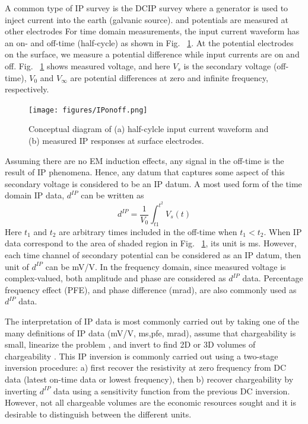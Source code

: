 \documentclass[letterpaper,11pt]{article}
\newcommand{\dip}{d^{IP}}
\begin{document}
A common type of IP survey is the  DCIP survey where a generator is used to  inject current into the earth (galvanic source). and potentials are measured at other electrodes For time domain measurements, the input current waveform has an  on- and off-time (half-cycle) as shown in Fig. ~\ref{Fig:IPonoff}. At the  potential electrodes on the surface, we measure a potential difference while input currents are on and off. Fig. ~\ref{Fig:IPonoff} shows measured voltage, and here $V_s$ is the secondary voltage (off-time), $V_0$ and $V_{\infty}$ are potential differences at zero and infinite frequency, respectively. 
\begin{figure}[htb]
  \centering
  \texttt{[image: figures/IPonoff.png]}
  \caption{Conceptual diagram of (a) half-cylcle input current waveform and (b) measured IP responses at surface electrodes.}
  \label{Fig:IPonoff}
\end{figure}
Assuming there are no EM induction effects, any signal in the off-time is the result of IP phenomena. Hence, any datum that captures some aspect of this secondary voltage is considered to be an IP datum. A most used form of the time domain IP data, $\dip$ can be written as  
\begin{equation}
  \dip = \frac{1}{V_0}\int_{t1}^{t^2} V_s(t)
\end{equation}
Here $t_1$ and $t_2$ are arbitrary times included in the off-time when $t_1 < t_2$. When IP data correspond to the area of shaded region in Fig. ~\ref{Fig:IPonoff},  its unit is ms. However, each time channel of secondary potential can be considered as an IP datum, then unit of $\dip$ can be mV/V. In the frequency domain, since measured voltage is complex-valued, both amplitude and phase are considered as $\dip$ data. Percentage frequency effect (PFE), and phase difference (mrad), are also commonly used as $\dip$ data.  

The interpretation of IP data is most commonly carried out by taking one of the many definitions of IP data (mV/V, ms,pfe, mrad), assume that chargeability is small, linearize  the problem \cite[]{seigel1959}, and invert to find 2D or 3D volumes of chargeability \cite[]{doug1994}. 
This IP inversion is commonly carried out using a two-stage inversion procedure: a) first recover the resistivity at zero frequency from DC data (latest on-time data or lowest frequency), then b) recover chargeability by inverting $\dip$ data using a sensitivity function from the previous DC inversion. However, not all chargeable volumes are the economic resources sought and it is desirable to distinguish between the different units. 
\end{document}
